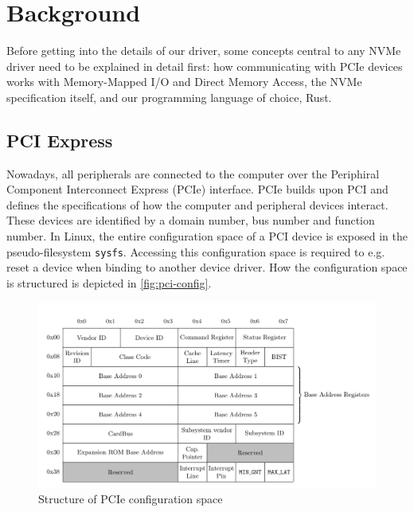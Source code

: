 \chapter{Background}\label{chapter:basics}

Before getting into the details of our driver, some concepts central to any NVMe driver need to be explained in detail first: how communicating with PCIe devices works with Memory-Mapped I/O and Direct Memory Access, the NVMe specification itself, and our programming language of choice, Rust.

\section{PCI Express}
Nowadays, all peripherals are connected to the computer over the Periphiral Component Interconnect Express (PCIe) interface. PCIe builds upon PCI and defines the specifications of how the computer and peripheral devices interact. These devices are identified by a domain number, bus number and function number. In Linux, the entire configuration space of a PCI device is exposed in the pseudo-filesystem \texttt{sysfs}. Accessing this configuration space is required to e.g. reset a device when binding to another device driver. How the configuration space is structured is depicted in \autoref{fig:pci-config}.


\begin{figure}[H]
  \centering
    \includegraphics[width=\textwidth]{figures/pcie-config-space}
    \caption{Structure of PCIe configuration space}
    \label{fig:pci-config}
\end{figure}



